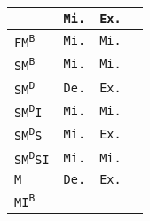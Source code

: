 \begin{tabular}{|l||c|c|c|}
 & \cellcolor{olive!80}\texttt{Mi.}
 & \cellcolor{orange!60}\texttt{Ex.}
 & \cellcolor{black!40}
 \\
 \hline

 \texttt{FM\textsuperscript{B}}

 & \cellcolor{olive!80}\texttt{Mi.}
 & \cellcolor{olive!80}\texttt{Mi.}
 & \cellcolor{black!40}
 \\
 \hline

 \texttt{SM\textsuperscript{B}}

 & \cellcolor{olive!80}\texttt{Mi.}
 & \cellcolor{olive!80}\texttt{Mi.}
 & \cellcolor{black!40}
 \\
 \hline

 \texttt{SM\textsuperscript{D}}

 & \cellcolor{blue!40}\texttt{De.}
 & \cellcolor{orange!60}\texttt{Ex.}
 & \cellcolor{black!40}
 \\
 \hline

 \texttt{SM\textsuperscript{D}I}

 & \cellcolor{olive!80}\texttt{Mi.}
 & \cellcolor{olive!80}\texttt{Mi.}
 & \cellcolor{black!40}
 \\
 \hline

 \texttt{SM\textsuperscript{D}S}

 & \cellcolor{olive!80}\texttt{Mi.}
 & \cellcolor{orange!60}\texttt{Ex.}
 & \cellcolor{black!40}
 \\
 \hline

 \texttt{SM\textsuperscript{D}SI}

 & \cellcolor{olive!80}\texttt{Mi.}
 & \cellcolor{olive!80}\texttt{Mi.}
 & \cellcolor{black!40}
 \\
 \hline

 \texttt{M}

 & \cellcolor{blue!40}\texttt{De.}
 & \cellcolor{orange!60}\texttt{Ex.}
 & \cellcolor{black!40}
 \\
 \hline

 \texttt{MI\textsuperscript{B}}


\end{tabular}

